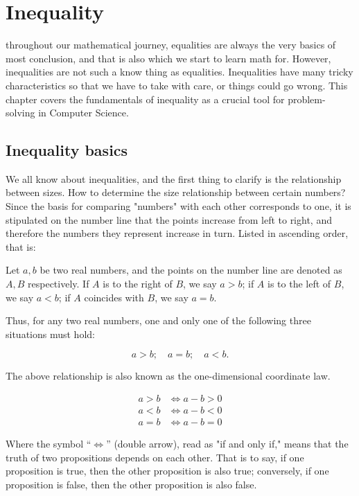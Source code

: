 \chapterspaceabove{6.75cm} 
\chapterspacebelow{7.25cm} 
\chapter{Inequality}
throughout our mathematical journey, equalities are always the very basics of most conclusion, and that is also which we start to learn math for. However, inequalities are not such a know thing as equalities.
Inequalities have many tricky characteristics so that we have to take with care, or things could go wrong. This chapter covers the fundamentals of inequality as a crucial tool for problem-solving in Computer Science.

\section{Inequality basics}
We all know about inequalities, and the first thing to clarify is the relationship between sizes. How to determine the size relationship between certain numbers? Since the basis for comparing "numbers" with each other corresponds to one, it is stipulated on the number line that the points increase from left to right, and therefore the numbers they represent increase in turn. Listed in ascending order, that is:

Let \( a, b \) be two real numbers, and the points on the number line are denoted as \( A, B \) respectively. If \( A \) is to the right of \( B \), we say \( a > b \); if \( A \) is to the left of \( B \), we say \( a < b \); if \( A \) coincides with \( B \), we say \( a = b \).

Thus, for any two real numbers, one and only one of the following three situations must hold:

\[
a > b; \quad a = b; \quad a < b.
\]

The above relationship is also known as the one-dimensional coordinate law.

\[
\begin{aligned}
a > b &\Leftrightarrow a - b > 0 \\
a < b &\Leftrightarrow a - b < 0 \\
a = b &\Leftrightarrow a - b = 0
\end{aligned}
\]

Where the symbol “\( \Leftrightarrow \)” (double arrow), read as "if and only if," means that the truth of two propositions depends on each other. That is to say, if one proposition is true, then the other proposition is also true; conversely, if one proposition is false, then the other proposition is also false.

